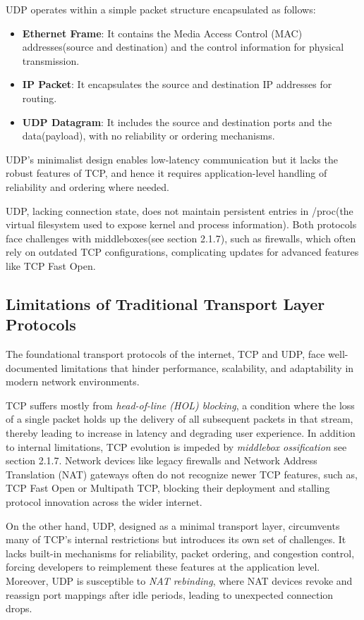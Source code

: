 UDP operates within a simple packet structure encapsulated as follows:

\begin{itemize}
    \item \textbf{Ethernet Frame}: It contains the Media Access Control (MAC) addresses(source and destination) and the control information for physical transmission.
    \item \textbf{IP Packet}: It encapsulates the source and destination IP addresses for routing.
    \item \textbf{UDP Datagram}: It includes the source and destination ports and the data(payload), with no reliability or ordering mechanisms.
\end{itemize}

UDP’s minimalist design enables low-latency communication but it lacks the robust features of TCP, and hence it requires application-level handling of reliability and ordering where needed.

UDP, lacking connection state, does not maintain persistent entries in /proc(the virtual filesystem used to expose kernel and process information). Both protocols face challenges with middleboxes(see section 2.1.7), such as firewalls, which often rely on outdated TCP configurations, complicating updates for advanced features like TCP Fast Open.

\subsection{Limitations of Traditional Transport Layer Protocols}

The foundational transport protocols of the internet, TCP and UDP, face well-documented limitations that hinder performance, scalability, and adaptability in modern network environments.

TCP suffers mostly from \textit{head-of-line (HOL) blocking}, a condition where the loss of a single packet holds up the delivery of all subsequent packets in that stream, thereby leading to increase in latency and degrading user experience. In addition to internal limitations, TCP evolution is impeded by \textit{middlebox ossification} see section 2.1.7. Network devices like legacy firewalls and Network Address Translation (NAT) gateways often do not recognize newer TCP features, such as, TCP Fast Open or Multipath TCP, blocking their deployment and stalling protocol innovation across the wider internet.

On the other hand, UDP, designed as a minimal transport layer, circumvents many of TCP’s internal restrictions but introduces its own set of challenges. It lacks built-in mechanisms for reliability, packet ordering, and congestion control, forcing developers to reimplement these features at the application level. Moreover, UDP is susceptible to \textit{NAT rebinding}, where NAT devices revoke and reassign port mappings after idle periods, leading to unexpected connection drops.

